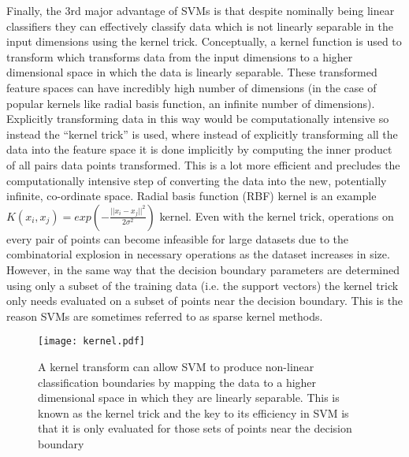 Finally, the 3rd major advantage of SVMs is that despite nominally being linear classifiers they can effectively classify data which 
is not linearly separable in the input dimensions using the kernel trick.  Conceptually, a kernel function is used to transform %
which transforms data from the input dimensions to a higher dimensional space in which the data is linearly separable.
These transformed feature spaces can have incredibly high number of dimensions (in the case of popular kernels like radial basis
function, an infinite number of dimensions).  Explicitly transforming data in this way would be computationally intensive
so instead the ``kernel trick'' is used, where instead of explicitly transforming all the data into the feature space
it is done implicitly by computing the inner product of all pairs data points transformed.  This is a lot more efficient
and precludes the computationally intensive step of converting the data into the new, potentially infinite, co-ordinate space.
Radial basis function (RBF) kernel is an example \(K(x_{i}, x_{j}) = exp ( - \frac{||x_{i} - x_{j}||^{2}}{2\sigma^{2}})\) kernel.
Even with the kernel trick, operations on every pair of points can become infeasible for large datasets due to the combinatorial
explosion in necessary operations as the dataset increases in size.  However, in the same way that the decision boundary parameters 
are determined using only a subset of the training data (i.e. the support vectors) the kernel trick only needs
evaluated on a subset of points near the decision boundary.  This is the reason SVMs are sometimes
referred to as sparse kernel methods.

\begin{figure}[h]
    \texttt{[image: kernel.pdf]}
    \caption[Kernel Trick]{A kernel transform can allow SVM to produce non-linear classification boundaries by mapping
        the data to a higher dimensional space in which they are linearly separable. This is known as the kernel
        trick and the key to its efficiency in SVM is that it is only evaluated for those sets of points near the 
    decision boundary}
    \label{fig:kernel}
\end{figure}



